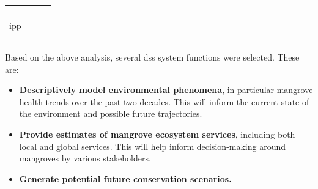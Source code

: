 \begin{landscape}
\begin{table}[t]
\begin{center}
\begin{tabular}{| C{2cm} |  L{5.33cm} | L{5.33cm} | L{5.33cm} |}
&  &  &  \\

&  &  &  \\

&  &  &  \\

&  &  & \\ \hline




\ac{ipp} &  &  &  \\

&  &  &  \\ \hline

\end{tabular}
\end{center}
\end{table}
\end{landscape}

\subsubsection{}

Based on the above analysis, several \ac{dss} system functions were selected. These are:

\begin{itemize}[itemsep=0pt,parsep=0pt]
    \item{\textbf{Descriptively model environmental phenomena}, in particular mangrove health trends over the past two decades. This will inform the current state of the environment and possible future trajectories.}
    \item{\textbf{Provide estimates of mangrove ecosystem services}, including both local and global services. This will help inform decision-making around mangroves by various stakeholders.}
    \item{\textbf{Generate potential future conservation scenarios.}}
\end{itemize}

